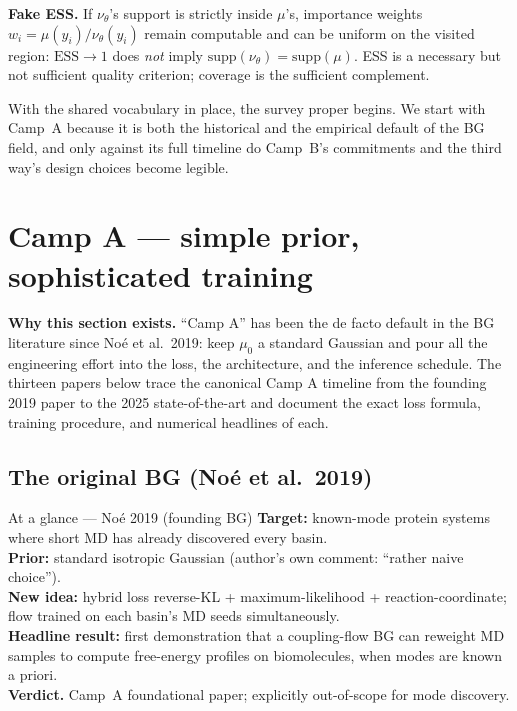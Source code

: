 \documentclass[11pt,letterpaper]{article}
\newcommand{\ESS}{\mathrm{ESS}}
\theoremstyle{plain}
\begin{document}
\textbf{Fake ESS.} If $\nu_\theta$'s support is strictly inside $\mu$'s, importance
weights $w_i=\mu(y_i)/\nu_\theta(y_i)$ remain computable and can be uniform on the
visited region: $\ESS\to 1$ does \emph{not} imply
$\mathrm{supp}(\nu_\theta)=\mathrm{supp}(\mu)$. ESS is a necessary but not
sufficient quality criterion; coverage is the sufficient complement.

With the shared vocabulary in place, the survey proper begins. We start
with Camp~A because it is both the historical and the empirical default of
the BG field, and only against its full timeline do Camp~B's commitments
and the third way's design choices become legible.

\section{Camp A --- simple prior, sophisticated training}

\begin{callout}
\textbf{Why this section exists.} ``Camp A'' has been the de facto default in the
BG literature since Noé et al.\ 2019: keep $\mu_0$ a standard Gaussian and pour all
the engineering effort into the loss, the architecture, and the inference schedule.
The thirteen papers below trace the canonical Camp A timeline from the founding
2019 paper to the 2025 state-of-the-art and document the exact loss formula,
training procedure, and numerical headlines of each.
\end{callout}

\subsection{The original BG (Noé et al.\ 2019)}

\begin{methodbox}{At a glance --- Noé 2019 (founding BG)}
\textbf{Target:} known-mode protein systems where short MD has already discovered every basin.\\
\textbf{Prior:} standard isotropic Gaussian (author's own comment: ``rather naive choice'').\\
\textbf{New idea:} hybrid loss reverse-KL + maximum-likelihood + reaction-coordinate; flow trained on each basin's MD seeds simultaneously.\\
\textbf{Headline result:} first demonstration that a coupling-flow BG can reweight MD samples to compute free-energy profiles on biomolecules, when modes are known a priori.\\
\textbf{Verdict.} Camp~A foundational paper; explicitly out-of-scope for mode discovery.
\end{methodbox}
\end{document}
